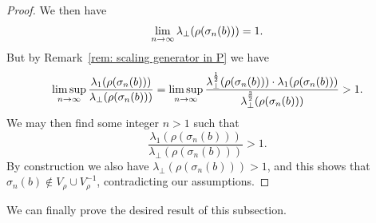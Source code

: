 \documentclass[AHL,Unicode,longabstracts]{cedram}
\renewcommand*{\to}{\mathchoice{\longrightarrow}{\rightarrow}{\rightarrow}{\rightarrow}}
\begin{document}
\begin{proof}
We then have
\[
\lim_{n\to\infty}\lambda_\perp(\rho(\sigma_n(b)))=1.
\]
But by Remark~\ref{rem: scaling generator in P} we have
\[
\limsup_{n\to\infty}\frac{\lambda_1(\rho(\sigma_n(b)))}{\lambda_\perp(\rho(\sigma_n(b)))}=\limsup_{n\to\infty}\frac{\lambda_\perp^{\frac{1}{2}}(\rho(\sigma_n(b)))\cdot \lambda_1(\rho(\sigma_n(b)))}{\lambda_\perp^{\frac{3}{2}}(\rho(\sigma_n(b)))}>1.
\]
We may then find some integer $n>1$ such that
\[
\frac{\lambda_1(\rho(\sigma_{n}(b)))}{\lambda_\perp(\rho(\sigma_{n}(b)))}>1.
\]
By construction we also have $\lambda_\perp(\rho(\sigma_{n}(b)))> 1$, and this shows that $\sigma_{n}(b)\notin V_{\rho}\cup V_{\rho}^{-1}$, contradicting our assumptions.
\end{proof}


We can finally prove the desired result of this subsection.
\end{document}

